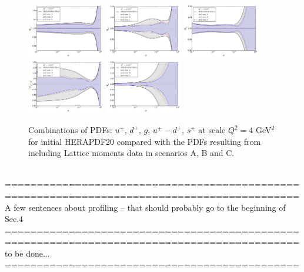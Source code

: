\begin{figure}[!t]
\centering
\includegraphics[width=0.3\textwidth]{plots/ratio_uPubar_Q2.pdf}
\includegraphics[width=0.3\textwidth]{plots/ratio_dPdbar_Q2.pdf}
\includegraphics[width=0.3\textwidth]{plots/ratio_g_Q2.pdf}
\\
\includegraphics[width=0.3\textwidth]{plots/ratio_uPubarMdMdbar_Q2.pdf}
\includegraphics[width=0.3\textwidth]{plots/ratio_sPsbar_Q2.pdf}
\caption{\small Combinations of PDFs: $u^+$, $d^+$, $g$, $u^+-d^+$, $s^+$ at scale $Q^2=4$ GeV$^2$
for initial HERAPDF20 compared with the PDFs resulting from including Lattice moments
data in scenarios A, B and C.
}
\label{fig:pdfsProf}
\end{figure}
%
%
\vspace{1cm}
\\
==============================================\\
==============================================\\
A few sentences about profiling -- that should probably go to the beginning of Sec.4\\
==============================================\\
==============================================\\
to be done...
\\
==============================================\\



